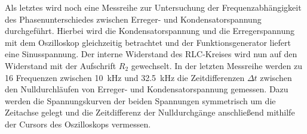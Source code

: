 Als letztes wird noch eine Messreihe zur Untersuchung der
Frequenzabhängigkeit des Phasenunterschiedes zwischen Erreger- und
Kondensatorspannung durchgeführt.  Hierbei wird die Kondensatorspannung
und die Erregerspannung mit dem Oszilloskop gleichzeitig betrachtet und
der Funktionsgenerator liefert eine Sinusspannung.  Der interne
Widerstand des RLC-Kreises wird nun auf den Widerstand mit der
Aufschrift $R_2$ gewechselt.  In der letzten Messreihe werden zu 16
Frequenzen zwischen \SI{10}{\kilo\hertz} und \SI{32.5}{\kilo\hertz} die
Zeitdifferenzen $\Delta t$ zwischen den Nulldurchläufen von Erreger- und
Kondensatorspannung gemessen. Dazu werden die Spannungskurven der beiden
Spannungen symmetrisch um die Zeitachse gelegt und die Zeitdifferenz der
Nulldurchgänge anschließend mithilfe der Cursors des Oszilloskops
vermessen.
